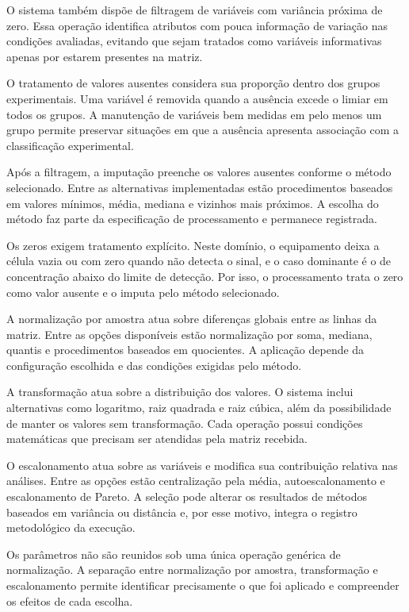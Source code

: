 O sistema também dispõe de filtragem de variáveis com variância próxima de zero. Essa operação identifica atributos com pouca informação de variação nas condições avaliadas, evitando que sejam tratados como variáveis informativas apenas por estarem presentes na matriz.

O tratamento de valores ausentes considera sua proporção dentro dos grupos experimentais. Uma variável é removida quando a ausência excede o limiar em todos os grupos. A manutenção de variáveis bem medidas em pelo menos um grupo permite preservar situações em que a ausência apresenta associação com a classificação experimental.

Após a filtragem, a imputação preenche os valores ausentes conforme o método selecionado. Entre as alternativas implementadas estão procedimentos baseados em valores mínimos, média, mediana e vizinhos mais próximos. A escolha do método faz parte da especificação de processamento e permanece registrada.

Os zeros exigem tratamento explícito. Neste domínio, o equipamento deixa a célula vazia ou com zero quando não detecta o sinal, e o caso dominante é o de concentração abaixo do limite de detecção. Por isso, o processamento trata o zero como valor ausente e o imputa pelo método selecionado.

A normalização por amostra atua sobre diferenças globais entre as linhas da matriz. Entre as opções disponíveis estão normalização por soma, mediana, quantis e procedimentos baseados em quocientes. A aplicação depende da configuração escolhida e das condições exigidas pelo método.

A transformação atua sobre a distribuição dos valores. O sistema inclui alternativas como logaritmo, raiz quadrada e raiz cúbica, além da possibilidade de manter os valores sem transformação. Cada operação possui condições matemáticas que precisam ser atendidas pela matriz recebida.

O escalonamento atua sobre as variáveis e modifica sua contribuição relativa nas análises. Entre as opções estão centralização pela média, autoescalonamento e escalonamento de Pareto. A seleção pode alterar os resultados de métodos baseados em variância ou distância e, por esse motivo, integra o registro metodológico da execução.

Os parâmetros não são reunidos sob uma única operação genérica de normalização. A separação entre normalização por amostra, transformação e escalonamento permite identificar precisamente o que foi aplicado e compreender os efeitos de cada escolha.

